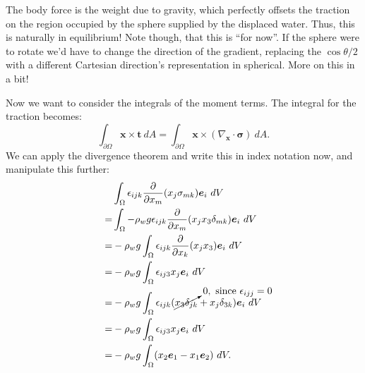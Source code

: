 The body force is the weight due to gravity, which perfectly offsets the traction on the region occupied by the sphere supplied by the displaced water. 
Thus, this is naturally in equilibrium!
Note though, that this is ``for now''. 
If the sphere were to rotate we'd have to change the direction of the gradient, replacing the $\cos\theta/2$ with a different Cartesian direction's representation in spherical. 
More on this in a bit!

Now we want to consider the integrals of the moment terms. 
The integral for the traction becomes:
\begin{equation*}
    \int_{\partial \Omega} \bm{x} \times \bm{t}~dA  = \int_{\partial\Omega} \bm{x} \times (\nabla_{\bm{x}} \cdot \bm{\sigma})~d
    A. 
\end{equation*}
We can apply the divergence theorem and write this in index notation now, and manipulate this further:
\begin{align*}
   & \int_{ \Omega} \epsilon_{ijk} \frac{\partial}{\partial x_m} (x_j \sigma_{mk}) \bm{e}_i ~dV\\
   =& \int_{ \Omega} -\rho_w g \epsilon_{ijk} \frac{\partial}{\partial x_m} (x_j x_3 \delta_{mk}) \bm{e}_i ~dV\\
   =& -\rho_w g \int_{ \Omega}  \epsilon_{ijk} \frac{\partial}{\partial x_k} (x_j x_3) \bm{e}_i ~dV\\
   =& -\rho_w g \int_{ \Omega}  \epsilon_{ij3}x_j \bm{e}_i ~dV\\
    =& -\rho_w g \int_{ \Omega}  \epsilon_{ijk} (\cancelto{0, \textrm{ since } \epsilon_{ijj} = 0}{x_3 \delta_{jk}} + x_j \delta_{3k}) \bm{e}_i ~dV\\
    =& -\rho_w g \int_{ \Omega}  \epsilon_{ij3}x_j \bm{e}_i ~dV\\
    =& -\rho_w g \int_{ \Omega}  (x_2 \bm{e}_1 - x_1 \bm{e}_2) ~dV.
\end{align*}

